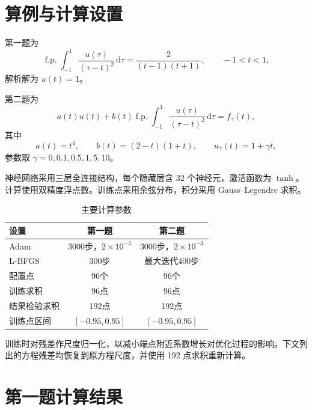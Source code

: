 \documentclass[UTF8,fontset=none,11pt,a4paper]{ctexart}
\begin{document}
\section{算例与计算设置}

第一题为
\begin{equation}
\operatorname{f.p.}\!\int_{-1}^{1}\frac{u(\tau)}{(\tau-t)^2}\,\mathrm d\tau
=\frac{2}{(t-1)(t+1)},\qquad -1<t<1,
\end{equation}
解析解为 $u(t)=1$。

第二题为
\begin{equation}
a(t)u(t)+b(t)\operatorname{f.p.}\!\int_{-1}^{1}
\frac{u(\tau)}{(\tau-t)^2}\,\mathrm d\tau=f_\gamma(t),
\end{equation}
其中
\begin{equation}
a(t)=t^4,\qquad b(t)=(2-t)(1+t),\qquad u_\gamma(t)=1+\gamma t,
\end{equation}
参数取 $\gamma=0,0.1,0.5,1,5,10$。

神经网络采用三层全连接结构，每个隐藏层含 32 个神经元，激活函数为 $\tanh$。计算使用双精度浮点数。训练点采用余弦分布，积分采用 Gauss--Legendre 求积。

\begin{table}[H]
\centering
\caption{主要计算参数}
\begin{tabular}{lcc}
\toprule
设置 & 第一题 & 第二题\\
\midrule
Adam & 3000步，$2\times10^{-3}$ & 3000步，$2\times10^{-3}$\\
L-BFGS & 300步 & 最大迭代400步\\
配置点 & 96个 & 96个\\
训练求积 & 96点 & 96点\\
结果检验求积 & 192点 & 192点\\
训练点区间 & $[-0.95,0.95]$ & $[-0.95,0.95]$\\
\bottomrule
\end{tabular}
\end{table}

训练时对残差作尺度归一化，以减小端点附近系数增长对优化过程的影响。下文列出的方程残差均恢复到原方程尺度，并使用 192 点求积重新计算。

\section{第一题计算结果}
\end{document}
